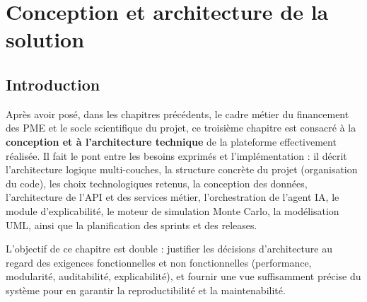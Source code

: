 \fancyfoot[C]{\thepage}\renewcommand{\headrulewidth}{0.4pt}
\usepackage[colorlinks=true,linkcolor=black,citecolor=black,urlcolor=black]{hyperref}
\usepackage{booktabs}\usepackage{tabularx}\usepackage{longtable}
\usepackage{multirow}\usepackage{array}\usepackage{enumitem}
\usepackage{listings}
\usepackage{amsmath, amssymb}
\usepackage{caption}\usepackage{subcaption}
\captionsetup{labelsep=endash, font=small, labelfont=bf, justification=centering}



\setcounter{chapter}{2} %

\chapter{Conception et architecture de la solution}

\section*{Introduction}

Après avoir posé, dans les chapitres précédents, le cadre métier du financement
des PME et le socle scientifique du projet, ce troisième chapitre est consacré à
la \textbf{conception et à l'architecture technique} de la plateforme effectivement
réalisée. Il fait le pont entre les besoins exprimés et l'implémentation : il décrit
l'architecture logique multi-couches, la structure concrète du projet (organisation
du code), les choix technologiques retenus, la conception des données, l'architecture
de l'API et des services métier, l'orchestration de l'agent IA, le module
d'explicabilité, le moteur de simulation Monte Carlo, la modélisation UML, ainsi
que la planification des sprints et des releases.

L'objectif de ce chapitre est double : justifier les décisions d'architecture au
regard des exigences fonctionnelles et non fonctionnelles (performance, modularité,
auditabilité, explicabilité), et fournir une vue suffisamment précise du système
pour en garantir la reproductibilité et la maintenabilité.

